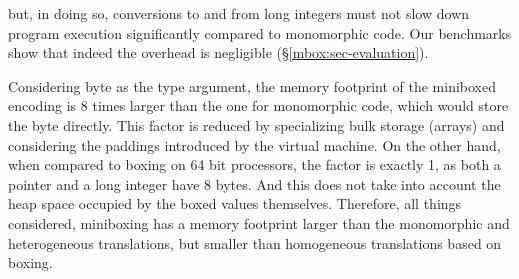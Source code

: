  but, in doing so, conversions to and from long integers must not slow down program execution significantly compared to monomorphic code. Our benchmarks show that indeed the overhead is negligible (\S{}\ref{mbox:sec-evaluation}).

 Considering byte as the type argument, the memory footprint of the miniboxed encoding is 8 times larger than the one for monomorphic code, which would store the byte directly. This factor is reduced by specializing bulk storage (arrays) and considering the paddings introduced by the virtual machine. On the other hand, when compared to boxing on 64 bit processors, the factor is exactly 1, as both a pointer and a long integer have 8 bytes. And this does not take into account the heap space occupied by the boxed values themselves. Therefore, all things considered, miniboxing has a memory footprint larger than the monomorphic and heterogeneous translations, but smaller than homogeneous translations based on boxing.

